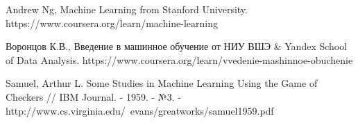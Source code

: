 \begin{thebibliography}{00}
	
	 Andrew Ng, Machine Learning from Stanford University. https://www.coursera.org/learn/machine-learning
	
	 Воронцов К.В., Введение в машинное обучение от НИУ ВШЭ \& Yandex School of Data Analysis. https://www.coursera.org/learn/vvedenie-mashinnoe-obuchenie
	
	 Samuel, Arthur L. Some Studies in Machine Learning Using the Game of Checkers // IBM Journal. - 1959. - №3. - http://www.cs.virginia.edu/~evans/greatworks/samuel1959.pdf
\end{thebibliography}
